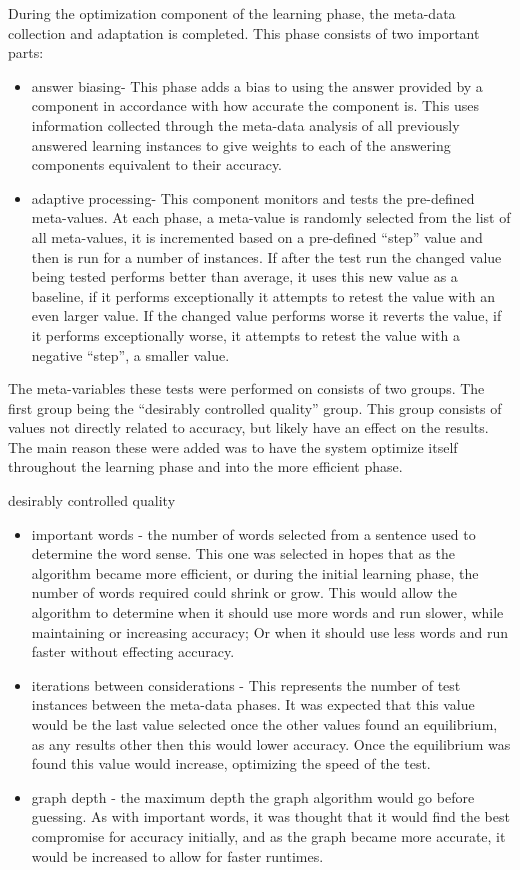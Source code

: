 During the optimization component of the learning phase, the meta-data collection and adaptation is completed.  This phase consists of two important parts:
\begin{itemize}
	\item answer biasing- This phase adds a bias to using the answer provided by a component in accordance with how accurate the component is.  This uses information collected through the meta-data analysis of all previously answered learning instances to give weights to each of the answering components equivalent to their accuracy.
	\item adaptive processing- This component monitors and tests the pre-defined meta-values.  At each phase, a meta-value is randomly selected from the list of all meta-values, it is incremented based on a pre-defined ``step'' value and then is run for a number of instances.  If after the test run the changed value being tested performs better than average, it uses this new value as a baseline, if it performs exceptionally it attempts to retest the value with an even larger value.  If the changed value performs worse it reverts the value, if it performs exceptionally worse, it attempts to retest the value with a negative ``step'', a smaller value.
\end{itemize}

The meta-variables these tests were performed on consists of two groups. The first group being the ``desirably controlled quality'' group.  This group consists of values not directly related to accuracy, but likely have an effect on the results.  The main reason these were added was to have the system optimize itself throughout the learning phase and into the more efficient phase.

desirably controlled quality
\begin{itemize}
	\item important words - the number of words selected from a sentence used to determine the word sense. This one was selected in hopes that as the algorithm became more efficient, or during the initial learning phase, the number of words required could shrink or grow.  This would allow the algorithm to determine when it should use more words and run slower, while maintaining or increasing accuracy; Or when it should use less words and run faster without effecting accuracy.
	\item iterations between considerations - This represents the number of test instances between the meta-data phases. It was expected that this value would be the last value selected once the other values found an equilibrium, as any results other then this would lower accuracy. Once the equilibrium was found this value would increase, optimizing the speed of the test.
	\item graph depth - the maximum depth the graph algorithm would go before guessing.  As with important words, it was thought that it would find the best compromise for accuracy initially, and as the graph became more accurate, it would be increased to allow for faster runtimes.
\end{itemize}

